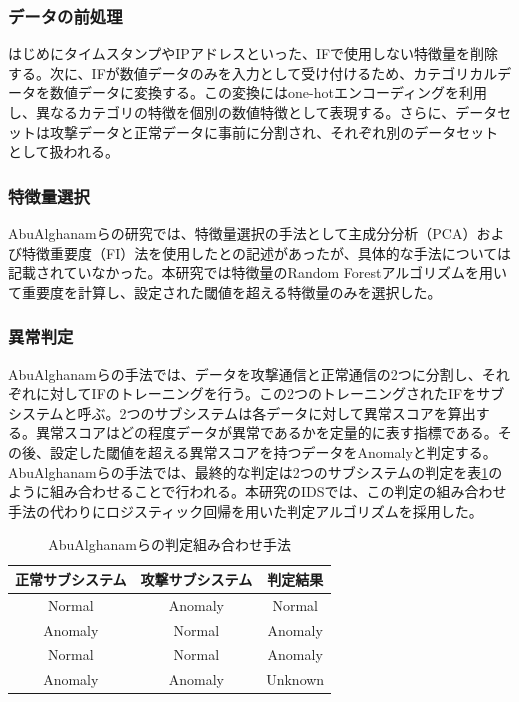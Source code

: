 \documentclass{css}
\begin{document}
\subsubsection{データの前処理}

はじめにタイムスタンプやIPアドレスといった、IFで使用しない特徴量を削除する。次に、IFが数値データのみを入力として受け付けるため、カテゴリカルデータを数値データに変換する。この変換にはone-hotエンコーディングを利用し、異なるカテゴリの特徴を個別の数値特徴として表現する。さらに、データセットは攻撃データと正常データに事前に分割され、それぞれ別のデータセットとして扱われる。

\subsubsection{特徴量選択}
AbuAlghanamらの研究では、特徴量選択の手法として主成分分析（PCA）および特徴重要度（FI）法を使用した\cite{AbuAlghanam2023-sx}との記述があったが、具体的な手法については記載されていなかった。本研究では特徴量のRandom Forestアルゴリズムを用いて重要度を計算し、設定された閾値を超える特徴量のみを選択した。

\subsubsection{異常判定}
AbuAlghanamらの手法では、データを攻撃通信と正常通信の2つに分割し、それぞれに対してIFのトレーニングを行う。この2つのトレーニングされたIFをサブシステムと呼ぶ。2つのサブシステムは各データに対して異常スコアを算出する。異常スコアはどの程度データが異常であるかを定量的に表す指標である。その後、設定した閾値を超える異常スコアを持つデータをAnomalyと判定する。AbuAlghanamらの手法では、最終的な判定は2つのサブシステムの判定を表\ref{tab:combination}のように組み合わせることで行われる。本研究のIDSでは、この判定の組み合わせ手法の代わりにロジスティック回帰を用いた判定アルゴリズムを採用した。

\begin{table}[ht]
    \caption{AbuAlghanamらの判定組み合わせ手法}
    \centering
    \footnotesize
    \begin{tabular}{ccc}
        \hline\hline
        正常サブシステム & 攻撃サブシステム & 判定結果\\
        \hline
        Normal & Anomaly & Normal \\
        Anomaly & Normal & Anomaly \\
        Normal & Normal & Anomaly \\
        Anomaly & Anomaly & Unknown \\
        \hline
    \end{tabular}
    \label{tab:combination}
\end{table}
\end{document}
